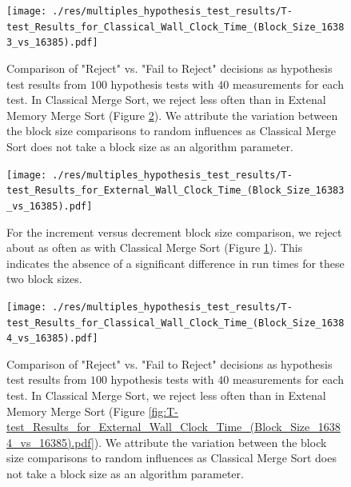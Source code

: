 \documentclass[twocolumn]{article}
\begin{document}
\begin{figure}[htb]
	\begin{minipage}{0.475 \textwidth}
	\centering
	\texttt{[image: ./res/multiples\_hypothesis\_test\_results/T-test\_Results\_for\_Classical\_Wall\_Clock\_Time\_(Block\_Size\_16383\_vs\_16385).pdf]}
	\caption{Comparison of "Reject" vs. "Fail to Reject" decisions as hypothesis test results from \( 100 \) hypothesis tests with \( 40 \) measurements for each test. 
	In Classical Merge Sort, we reject less often than in Extenal Memory Merge Sort (Figure \ref{fig:T-test_Results_for_External_Wall_Clock_Time_(Block_Size_16383_vs_16385).pdf}). 
	We attribute the variation between the block size comparisons to random influences as Classical Merge Sort does not take a block size as an algorithm parameter.}
	\label{fig:T-test_Results_for_Classical_Wall_Clock_Time_(Block_Size_16383_vs_16385).pdf}
	\end{minipage}
\end{figure}

\begin{figure}[htb]
	\begin{minipage}{0.475 \textwidth}
	\centering
	\texttt{[image: ./res/multiples\_hypothesis\_test\_results/T-test\_Results\_for\_External\_Wall\_Clock\_Time\_(Block\_Size\_16383\_vs\_16385).pdf]}
	\caption{For the increment versus decrement block size comparison, we reject about as often as with Classical Merge Sort (Figure \ref{fig:T-test_Results_for_Classical_Wall_Clock_Time_(Block_Size_16383_vs_16385).pdf}). This indicates the absence of a significant difference in run times for these two block sizes.}
	\label{fig:T-test_Results_for_External_Wall_Clock_Time_(Block_Size_16383_vs_16385).pdf}
	\end{minipage}
\end{figure}

\begin{figure}[htb]
	\begin{minipage}{0.475 \textwidth}
	\centering
	\texttt{[image: ./res/multiples\_hypothesis\_test\_results/T-test\_Results\_for\_Classical\_Wall\_Clock\_Time\_(Block\_Size\_16384\_vs\_16385).pdf]}
	\caption{Comparison of "Reject" vs. "Fail to Reject" decisions as hypothesis test results from \( 100 \) hypothesis tests with \( 40 \) measurements for each test. 
	In Classical Merge Sort, we reject less often than in Extenal Memory Merge Sort (Figure \ref{fig:T-test_Results_for_External_Wall_Clock_Time_(Block_Size_16384_vs_16385).pdf}).
	We attribute the variation between the block size comparisons to random influences as Classical Merge Sort does not take a block size as an algorithm parameter.}
	\label{fig:T-test_Results_for_Classical_Wall_Clock_Time_(Block_Size_16384_vs_16385).pdf}
	\end{minipage}
\end{figure}
\end{document}
